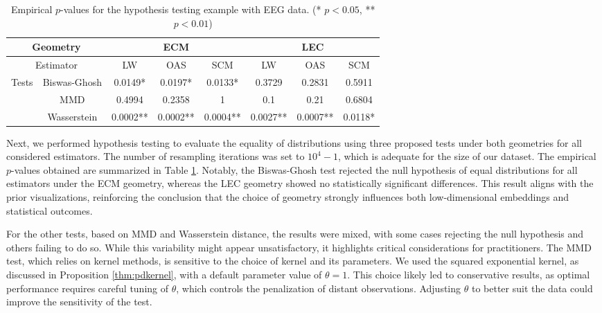 \documentclass[10pt]{article}
\begin{document}
\begin{table}[h]
	\caption{Empirical $p$-values for the hypothesis testing example with EEG data. (* $p < 0.05$, ** $p < 0.01$)}
	\label{table:testing}
	\centering
	\begin{tabular}{|cc|ccc|ccc|}
		\hline
		\multicolumn{2}{|c|}{Geometry}                      & \multicolumn{3}{c|}{ECM}                                           & \multicolumn{3}{c|}{LEC}                                           \\ \hline
		\multicolumn{2}{|c|}{Estimator}                     & \multicolumn{1}{c|}{LW}     & \multicolumn{1}{c|}{OAS}    & SCM    & \multicolumn{1}{c|}{LW}     & \multicolumn{1}{c|}{OAS}    & SCM    \\ \hline\hline
		\multicolumn{1}{|c|}{\multirow{3}{*}{Tests}} & Biswas-Ghosh   & \multicolumn{1}{c|}{0.0149*} & \multicolumn{1}{c|}{0.0197*} & 0.0133* & \multicolumn{1}{c|}{0.3729} & \multicolumn{1}{c|}{0.2831} & 0.5911 \\ \cline{2-8} 
		\multicolumn{1}{|c|}{}                       & MMD  & \multicolumn{1}{c|}{0.4994} & \multicolumn{1}{c|}{0.2358} & 1      & \multicolumn{1}{c|}{0.1}    & \multicolumn{1}{c|}{0.21}   & 0.6804 \\ \cline{2-8} 
		\multicolumn{1}{|c|}{}                       & Wasserstein & \multicolumn{1}{c|}{0.0002**} & \multicolumn{1}{c|}{0.0002**} & 0.0004** & \multicolumn{1}{c|}{0.0027**} & \multicolumn{1}{c|}{0.0007**} & 0.0118* \\ \hline
	\end{tabular}
\end{table}

Next, we performed hypothesis testing to evaluate the equality of distributions using three proposed tests under both geometries for all considered estimators. The number of resampling iterations was set to \(10^4 - 1\), which is adequate for the size of our dataset. The empirical \(p\)-values obtained are summarized in Table \ref{table:testing}. Notably, the Biswas-Ghosh test rejected the null hypothesis of equal distributions for all estimators under the ECM geometry, whereas the LEC geometry showed no statistically significant differences. This result aligns with the prior visualizations, reinforcing the conclusion that the choice of geometry strongly influences both low-dimensional embeddings and statistical outcomes.

For the other tests, based on MMD and Wasserstein distance, the results were mixed, with some cases rejecting the null hypothesis and others failing to do so. While this variability might appear unsatisfactory, it highlights critical considerations for practitioners. The MMD test, which relies on kernel methods, is sensitive to the choice of kernel and its parameters. We used the squared exponential kernel, as discussed in Proposition \ref{thm:pdkernel}, with a default parameter value of \(\theta=1\). This choice likely led to conservative results, as optimal performance requires careful tuning of \(\theta\), which controls the penalization of distant observations. Adjusting \(\theta\) to better suit the data could improve the sensitivity of the test.
\end{document}
